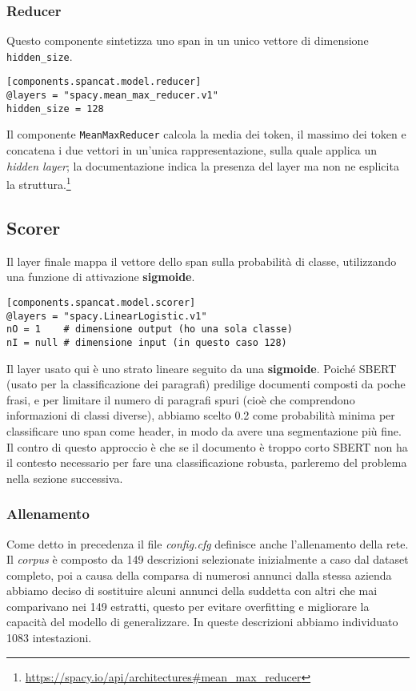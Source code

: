 \subsubsection{Reducer}

\noindent Questo componente sintetizza uno span in un unico vettore di dimensione \texttt{hidden\_size}.

\begin{lstlisting}[style=cmd]
[components.spancat.model.reducer]
@layers = "spacy.mean_max_reducer.v1"
hidden_size = 128
\end{lstlisting}

\noindent Il componente \texttt{MeanMaxReducer} calcola la media dei token, il massimo dei token e concatena i due vettori in un'unica rappresentazione, sulla quale applica un \textit{hidden layer}; la documentazione indica la presenza del layer ma non ne esplicita la struttura.\footnote{\url{https://spacy.io/api/architectures\#mean\_max\_reducer}}
\subsection{Scorer}

\noindent Il layer finale mappa il vettore dello span sulla probabilità di classe, utilizzando una funzione di attivazione \textbf{sigmoide}.

\begin{lstlisting}[style=cmd]
[components.spancat.model.scorer]
@layers = "spacy.LinearLogistic.v1"
nO = 1    # dimensione output (ho una sola classe)
nI = null # dimensione input (in questo caso 128)
\end{lstlisting}
Il layer usato qui è uno strato lineare seguito da una \textbf{sigmoide}.
Poiché SBERT (usato per la classificazione dei paragrafi) predilige documenti composti da poche frasi, e per limitare il numero di paragrafi spuri (cioè che comprendono informazioni di classi diverse), abbiamo scelto 0.2 come probabilità minima per classificare uno span come header, in modo da avere una segmentazione più fine.
Il contro di questo approccio è che se il documento è troppo corto SBERT non ha il contesto necessario per fare una classificazione robusta, parleremo del problema nella sezione successiva.

\subsubsection{Allenamento}

\noindent Come detto in precedenza il file \textit{config.cfg} definisce anche l'allenamento della rete. Il \textit{corpus} è composto da 149 descrizioni selezionate inizialmente a caso dal dataset completo, poi a causa della comparsa di numerosi annunci dalla stessa azienda abbiamo deciso di sostituire alcuni annunci della suddetta con altri che mai comparivano nei 149 estratti, questo per evitare overfitting e migliorare la capacità del modello di generalizzare. In queste descrizioni abbiamo individuato 1083 intestazioni.

